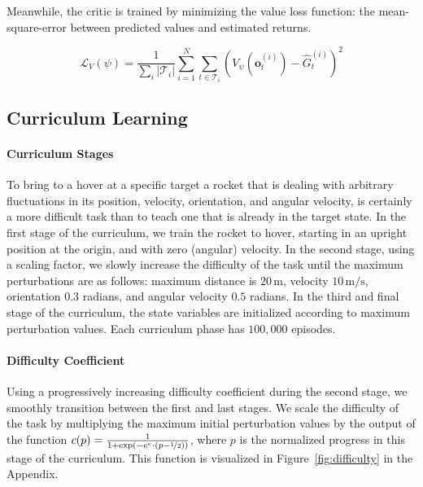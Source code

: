 \documentclass{article}
\begin{document}
Meanwhile, the critic is trained by minimizing the value loss function: the mean-square-error between predicted values and estimated returns.

\begin{equation}
  \mathcal{L}_V(\psi) = \frac{1}{\sum_i |\mathcal{T}_i|}
  \sum_{i=1}^{N} \sum_{t \in \mathcal{T}_i}
  \left(V_\psi(\mathbf{o}_t^{(i)}) - \hat{G}_t^{(i)}\right)^2
  \label{eq:value_loss}
\end{equation}

\subsection{Curriculum Learning}

\paragraph{Curriculum Stages}

To bring to a hover at a specific target a rocket that is dealing with arbitrary fluctuations in its position, velocity, orientation, and angular velocity, is certainly a more difficult task than to teach one that is already in the target state. In the first stage of the curriculum, we train the rocket to hover, starting in an upright position at the origin, and with zero (angular) velocity. In the second stage, using a scaling factor, we slowly increase the difficulty of the task until the maximum perturbations are as follows: maximum distance is $20\,\text{m}$, velocity $10\,\text{m/s}$, orientation $0.3$ radians, and angular velocity $0.5$ radians. In the third and final stage of the curriculum, the state variables are initialized according to maximum perturbation values. Each curriculum phase has $100{,}000$ episodes.

\paragraph{Difficulty Coefficient}

Using a progressively increasing difficulty coefficient during the second stage, we smoothly transition between the first and last stages. We scale the difficulty of the task by multiplying the maximum initial perturbation values by the output of the function $c(p) = \frac{1}{1 + \exp(-e^e \cdot (p - \nicefrac{1}{2}))}$, where $p$ is the normalized progress in this stage of the curriculum. This function is visualized in Figure~\ref{fig:difficulty} in the Appendix.
\end{document}
